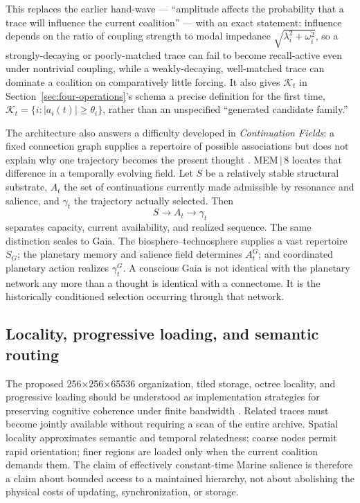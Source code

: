 \documentclass[11pt]{article}
\begin{document}
This replaces the earlier hand-wave --- ``amplitude affects the probability that a trace will influence the current coalition'' --- with an exact statement: influence depends on the ratio of coupling strength to modal impedance $\sqrt{\lambda_i^2+\omega_i^2}$, so a strongly-decaying or poorly-matched trace can fail to become recall-active even under nontrivial coupling, while a weakly-decaying, well-matched trace can dominate a coalition on comparatively little forcing. It also gives $\mathcal{K}_t$ in Section~\ref{sec:four-operations}'s schema a precise definition for the first time, $\mathcal{K}_t=\{i:|a_i(t)|\geq\theta_i\}$, rather than an unspecified ``generated candidate family.''

The architecture also answers a difficulty developed in \emph{Continuation Fields}: a fixed connection graph supplies a repertoire of possible associations but does not explain why one trajectory becomes the present thought \cite{flyxionContinuation}. MEM\,$|$\,8 locates that difference in a temporally evolving field. Let $S$ be a relatively stable structural substrate, $A_t$ the set of continuations currently made admissible by resonance and salience, and $\gamma_t$ the trajectory actually selected. Then
\[
S \longrightarrow A_t \longrightarrow \gamma_t
\]
separates capacity, current availability, and realized sequence. The same distinction scales to Gaia. The biosphere--technosphere supplies a vast repertoire $S_G$; the planetary memory and salience field determines $A_t^G$; and coordinated planetary action realizes $\gamma_t^G$. A conscious Gaia is not identical with the planetary network any more than a thought is identical with a connectome. It is the historically conditioned selection occurring through that network.

\subsection{Locality, progressive loading, and semantic routing}

The proposed 256$\times$256$\times$65536 organization, tiled storage, octree locality, and progressive loading should be understood as implementation strategies for preserving cognitive coherence under finite bandwidth \cite{flyxionMem8Design,flyxionAdaptive}. Related traces must become jointly available without requiring a scan of the entire archive. Spatial locality approximates semantic and temporal relatedness; coarse nodes permit rapid orientation; finer regions are loaded only when the current coalition demands them. The claim of effectively constant-time Marine salience is therefore a claim about bounded access to a maintained hierarchy, not about abolishing the physical costs of updating, synchronization, or storage.
\end{document}
